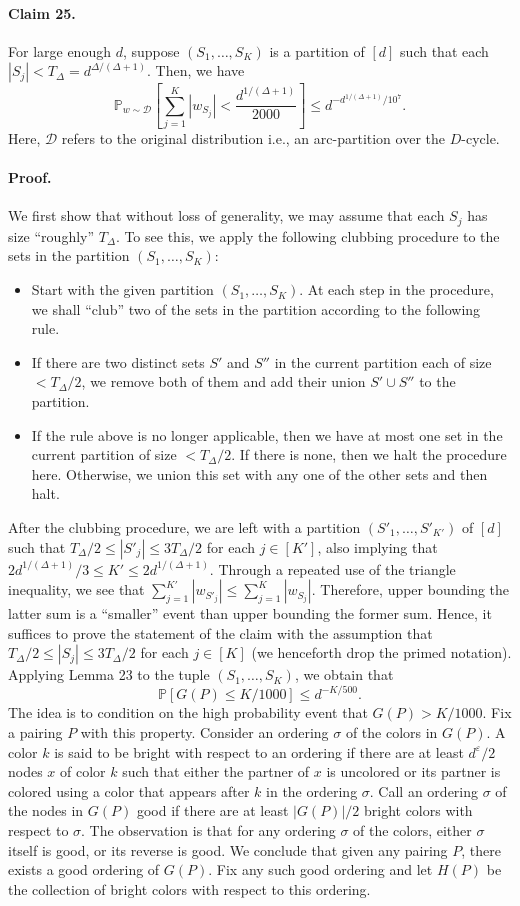\documentclass[10pt,a4paper]{article}
\begin{document}
\paragraph{Claim 25.} For large enough $d$, suppose $(S_1,\ldots,S_K)$ is a partition of $[d]$ such that each $|S_j|<T_\Delta=d^{\Delta/(\Delta+1)}$. Then, we have
\[\mathbb P_{w\sim\mathcal D}\left[\sum_{j=1}^K|w_{S_j}|<\frac{d^{1/(\Delta+1)}}{2000}\right]\leq d^{-d^{1/(\Delta+1)}/10^7}.\]
Here, $\mathcal D$ refers to the original distribution i.e., an arc-partition over the $D$-cycle.
\paragraph{Proof.} We first show that without loss of generality, we may assume that each $S_j$ has size ``roughly'' $T_\Delta$. To see this, we apply the following clubbing procedure to the sets in the partition $(S_1,\ldots,S_K)$:
\begin{itemize}
\item Start with the given partition $(S_1,\ldots,S_K)$. At each step in the procedure, we shall ``club'' two of the sets in the partition according to the following rule.
\item If there are two distinct sets $S'$ and $S''$ in the current partition each of size $<T_\Delta/2$, we remove both of them and add their union $S'\cup S''$ to the partition.
\item If the rule above is no longer applicable, then we have at most one set in the current partition of size $<T_\Delta/2$. If there is none, then we halt the procedure here. Otherwise, we union this set with any one of the other sets and then halt.
\end{itemize}
After the clubbing procedure, we are left with a partition $(S'_1,\ldots,S'_{K'})$ of $[d]$ such that $T_\Delta/2\leq|S'_j|\leq3T_\Delta/2$ for each $j\in[K']$, also implying that $2d^{1/(\Delta+1)}/3\leq K'\leq2d^{1/(\Delta+1)}$. Through a repeated use of the triangle inequality, we see that $\sum_{j=1}^{K'}|w_{S'_j}|\leq\sum_{j=1}^K|w_{S_j}|$. Therefore, upper bounding the latter sum is a ``smaller'' event than upper bounding the former sum. Hence, it suffices to prove the statement of the claim with the assumption that $T_\Delta/2\leq|S_j|\leq3T_\Delta/2$ for each $j\in[K]$ (we henceforth drop the primed notation).
Applying Lemma 23 to the tuple $(S_1,\ldots,S_K)$, we obtain that
\[\mathbb P[G(P)\leq K/1000]\leq d^{-K/500}.\]
The idea is to condition on the high probability event that $G(P)>K/1000$. Fix a pairing $P$ with this property. Consider an ordering $\sigma$ of the colors in $G(P)$. A color $k$ is said to be bright with respect to an ordering if there are at least $d^\varepsilon/2$ nodes $x$ of color $k$ such that either the partner of $x$ is uncolored or its partner is colored using a color that appears after $k$ in the ordering $\sigma$. Call an ordering $\sigma$ of the nodes in $G(P)$ good if there are at least $|G(P)|/2$ bright colors with respect to $\sigma$. The observation is that for any ordering $\sigma$ of the colors, either $\sigma$ itself is good, or its reverse is good. We conclude that given any pairing $P$, there exists a good ordering of $G(P)$. Fix any such good ordering and let $H(P)$ be the collection of bright colors with respect to this ordering.
\end{document}

